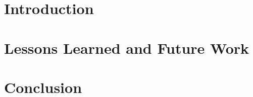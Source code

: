 \documentclass{ucbthesis}
\begin{document}
\pagestyle{headings}


\chapter{Introduction}






\chapter{Lessons Learned and Future Work}
\chapter{Conclusion}


\printbibliography
\end{document}
